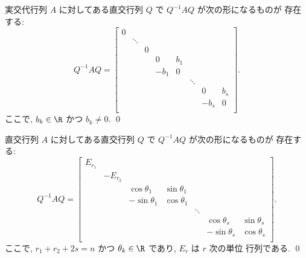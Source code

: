 \documentclass[12pt,twoside]{jarticle}
\begin{document}
\begin{question}[実交代行列の標準形, 10点]
\label{q:real-alternating}
  実交代行列 $A$ に対してある直交行列 $Q$ で $Q^{-1}AQ$ が次の形になるものが
  存在する:
  \begin{equation*}
    Q^{-1}AQ =
    \begin{bmatrix}
         0     &        &          &       &     &        &       &     \\
               & \ddots &          &       &     &        &       &     \\
               &        &    0     &       &     &        &       &     \\
               &        &          &    0  & b_1 &        &       &     \\
               &        &          & - b_1 & 0   &        &       &     \\
               &        &          &       &     & \ddots &       &     \\
               &        &          &       &     &        &    0  & b_s \\
               &        &          &       &     &        & - b_s & 0   \\
    \end{bmatrix}.
  \end{equation*}
  ここで, $b_k\in\R$ かつ $b_k\ne 0$. 
  \qed
\end{question}


\begin{question}[直交行列の標準形, 10点]
\label{q:orthogonal}
  直交行列 $A$ に対してある直交行列 $Q$ で $Q^{-1}AQ$ が次の形になるものが
  存在する:
  \begin{equation*}
    Q^{-1}AQ =
    \begin{bmatrix}
      E_{r_1} &          &               &              &        & & \\
              & -E_{r_2} &               &              &        & & \\
              &          &  \cos\theta_1 & \sin\theta_1 &        & & \\
              &          & -\sin\theta_1 & \cos\theta_1 &        & & \\
              &          &               &              & \ddots & & \\
              &          &               &              &        &  \cos\theta_s & \sin\theta_s \\
              &          &               &              &        & -\sin\theta_s & \cos\theta_s \\
    \end{bmatrix}.
  \end{equation*}
  ここで, $r_1+r_2+2s=n$ かつ $\theta_k\in\R$ であり, $E_r$ は $r$ 次の単位
  行列である. 
  \qed
\end{question}
\end{document}
